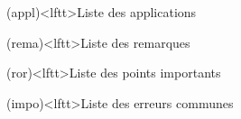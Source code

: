 \documentclass[../../main/main.tex]{subfiles}
\begin{document}
\begin{boxes}
	\begin{tcb}(appl)<lftt>{Liste des applications}
	\end{tcb}
	\begin{tcb}(rema)<lftt>{Liste des remarques}
	\end{tcb}
	\begin{tcb}(ror)<lftt>{Liste des points importants}
	\end{tcb}
	\begin{tcb}(impo)<lftt>{Liste des erreurs communes}
	\end{tcb}
\end{boxes}
\end{document}
